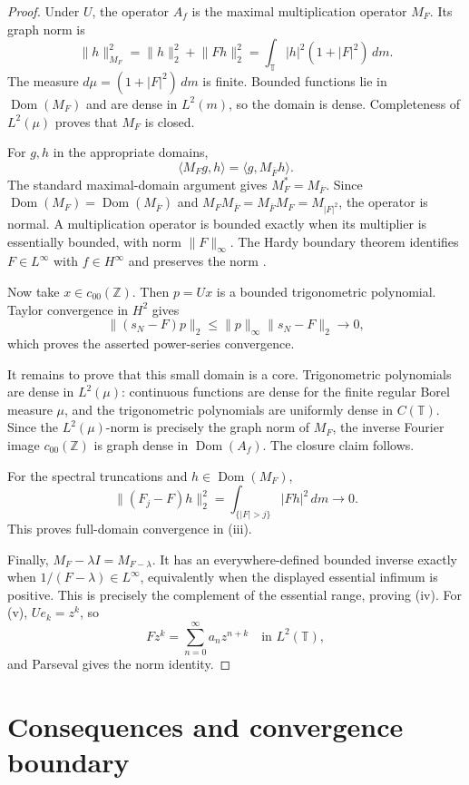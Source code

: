 \documentclass[11pt]{article}
\theoremstyle{remark}
\newcommand{\T}{\mathbb{T}}
\newcommand{\Z}{\mathbb{Z}}
\newcommand{\norm}[1]{\lVert #1\rVert}
\newcommand{\Dom}{\operatorname{Dom}}
\begin{document}
\begin{proof}
Under \(U\), the operator \(A_f\) is the maximal multiplication operator
\(M_F\).  Its graph norm is
\[
 \norm h_{M_F}^2
 =\norm h_2^2+\norm{Fh}_2^2
 =\int_{\T}|h|^2(1+|F|^2)\,dm.
\]
The measure \(d\mu=(1+|F|^2)\,dm\) is finite.  Bounded functions lie in
\(\Dom(M_F)\) and are dense in \(L^2(m)\), so the domain is dense.
Completeness of \(L^2(\mu)\) proves that \(M_F\) is closed.

For \(g,h\) in the appropriate domains,
\[
 \langle M_Fg,h\rangle=\langle g,M_{\overline F}h\rangle.
\]
The standard maximal-domain argument gives
\(M_F^*=M_{\overline F}\).  Since
\(\Dom(M_F)=\Dom(M_{\overline F})\) and
\(M_FM_{\overline F}=M_{\overline F}M_F=M_{|F|^2}\), the operator is
normal.  A multiplication operator is bounded exactly when its multiplier
is essentially bounded, with norm \(\norm F_\infty\).  The Hardy boundary
theorem identifies \(F\in L^\infty\) with \(f\in H^\infty\) and preserves
the norm \cite{Duren}.

Now take \(x\in c_{00}(\Z)\).  Then \(p=Ux\) is a bounded trigonometric
polynomial.  Taylor convergence in \(H^2\) gives
\[
 \norm{(s_N-F)p}_2
 \le \norm p_\infty\norm{s_N-F}_2\longrightarrow0,
\]
which proves the asserted power-series convergence.

It remains to prove that this small domain is a core.  Trigonometric
polynomials are dense in \(L^2(\mu)\): continuous functions are dense for
the finite regular Borel measure \(\mu\), and the trigonometric polynomials
are uniformly dense in \(C(\T)\).  Since the \(L^2(\mu)\)-norm is precisely
the graph norm of \(M_F\), the inverse Fourier image \(c_{00}(\Z)\) is graph
dense in \(\Dom(A_f)\).  The closure claim follows.

For the spectral truncations and \(h\in\Dom(M_F)\),
\[
 \norm{(F_j-F)h}_2^2
 =\int_{\{|F|>j\}}|Fh|^2\,dm\longrightarrow0.
\]
This proves full-domain convergence in (iii).

Finally, \(M_F-\lambda I=M_{F-\lambda}\).  It has an everywhere-defined
bounded inverse exactly when \(1/(F-\lambda)\in L^\infty\), equivalently
when the displayed essential infimum is positive.  This is precisely the
complement of the essential range, proving (iv).  For (v), \(Ue_k=z^k\), so
\[
 Fz^k=\sum_{n=0}^{\infty}a_nz^{n+k}
\quad\text{in }L^2(\T),
\]
and Parseval gives the norm identity.
\end{proof}

\section{Consequences and convergence boundary}
\end{document}
